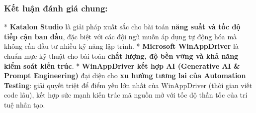 \subsubsection{Kết luận đánh giá chung:}
* \textbf{Katalon Studio} là giải pháp xuất sắc cho bài toán \textbf{năng suất và tốc độ tiếp cận ban đầu}, đặc biệt với các đội ngũ muốn áp dụng tự động hóa mà không cần đầu tư nhiều kỹ năng lập trình.
* \textbf{Microsoft WinAppDriver} là chuẩn mực kỹ thuật cho bài toán \textbf{chất lượng, độ bền vững và khả năng kiểm soát kiến trúc}.
* \textbf{WinAppDriver kết hợp AI (Generative AI & Prompt Engineering)} đại diện cho \textbf{xu hướng tương lai của Automation Testing}: giải quyết triệt để điểm yếu lớn nhất của WinAppDriver (thời gian viết code lâu), kết hợp sức mạnh kiến trúc mã nguồn mở với tốc độ thần tốc của trí tuệ nhân tạo.
